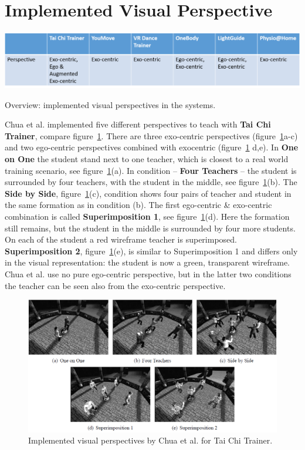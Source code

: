 \newpage
\section{Implemented Visual Perspective}
\begin{table}[h]
	\centering
	\includegraphics[width=1.0\textwidth]{img/tbl1.png}
	\caption{Overview: implemented visual perspectives in the systems.}
	\label{fig:tbl1}
\end{table}
Chua et al. \cite{Chua2003} implemented five different perspectives to teach with \textbf{Tai Chi Trainer}, compare figure~\ref{fig:taichiperspectives}. There are three exo-centric perspectives (figure~\ref{fig:taichiperspectives}a-c) and two ego-centric perspectives combined with exocentric (figure~\ref{fig:taichiperspectives} d,e). In \textbf{One on One} the student stand next to one teacher, which is closest to a real world training scenario, see figure~\ref{fig:taichiperspectives}(a). In condition \--- \textbf{Four Teachers} \--- the student is surrounded by four teachers, with the student in the middle, see figure~\ref{fig:taichiperspectives}(b). The \textbf{Side by Side}, figure~\ref{fig:taichiperspectives}(c), condition shows four pairs of teacher and student in the same formation as in condition (b). The first ego-centric \& exo-centric combination is called \textbf{Superimposition 1}, see figure~\ref{fig:taichiperspectives}(d). Here the formation still remains, but the student in the middle is surrounded by four more students. On each of the student a red wireframe teacher is superimposed. \textbf{Superimposition 2}, figure~\ref{fig:taichiperspectives}(e), is similar to Superimposition 1 and differs only in the visual representation: the student is now a green, transparent wireframe. Chua et al. use no pure ego-centric perspective, but in the latter two conditions the teacher can be seen also from the exo-centric perspective.
\begin{figure}[h!]
	\centering
	\includegraphics[width=1.0\textwidth]{img/taichi_perspectives.png}
	\caption{Implemented visual perspectives by Chua et al. \cite{Chua2003} for Tai Chi Trainer.}
	\label{fig:taichiperspectives}
\end{figure}\\
